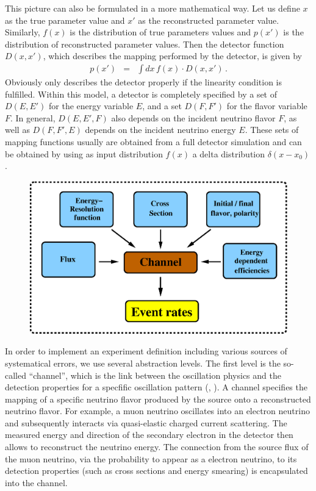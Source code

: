 This picture can also be formulated in a more mathematical way. Let us define $x$ as the true parameter value and $x'$ as the reconstructed parameter value. Similarly, $f(x)$ is the distribution of true parameters values and $p(x')$ is the distribution of reconstructed parameter values. Then the detector function  $D(x,x')$, which describes the mapping performed by the detector, is given by
\begin{eqnarray}
\label{equ:mapping}
p(x')&=&\int dx\, f(x)\cdot D(x,x')\,.
\end{eqnarray}
Obviously  only describes the detector properly
if the linearity condition is fulfilled. Within this model, a detector
is completely specified by a set of $D(E,E')$ for the energy variable $E$,
and a set $D(F,F')$ for the flavor variable $F$. In general, $D(E,E',F)$ also depends on the incident neutrino flavor $F$, as well as $D(F,F',E)$ depends on the incident neutrino energy $E$. These sets of mapping functions usually are obtained from a 
full detector simulation and can be obtained by using as input 
distribution $f(x)$ a delta distribution $\delta(x-x_0)$.

\begin{figure}[t]
\begin{center}
\includegraphics[width=13cm]{AEDL1}
\end{center}
\end{figure}

In order to implement an experiment definition including various
sources of systematical errors, we use several abstraction levels. 
The first level is the so-called ``channel'', 
 which is the link between 
the oscillation physics and the detection properties for a specfific oscillation pattern (\cf, ). A channel specifies the mapping of a specific neutrino flavor produced by the source onto a reconstructed neutrino flavor.
For example, a muon neutrino oscillates into an electron neutrino and subsequently interacts via quasi-elastic charged current scattering. The measured energy and direction of
the secondary electron in the detector then allows to reconstruct the neutrino energy. The connection from the source flux of the muon neutrino, via the  probability to appear as a electron neutrino, to its detection properties (such as cross sections and energy smearing) is encapsulated into the channel.

